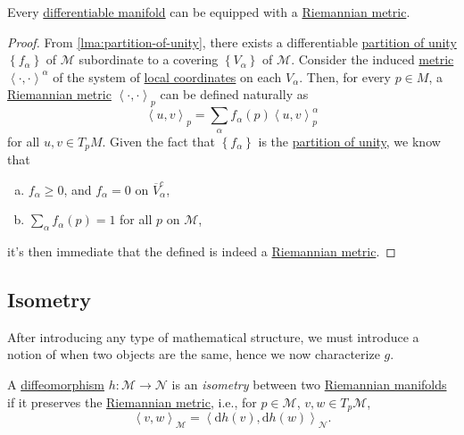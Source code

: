 \begin{theorem}
	Every \hyperref[def:smooth-manifold]{differentiable manifold} can be equipped with a \hyperref[def:Riemannian-metric]{Riemannian metric}.
\end{theorem}
\begin{proof}
	From \autoref{lma:partition-of-unity}, there exists a differentiable \hyperref[def:partition-of-unity]{partition of unity} \(\left\{ f_\alpha \right\} \) of \(\mathcal{M} \) subordinate to a covering \(\left\{ V_\alpha \right\} \) of \(\mathcal{M} \). Consider the induced \hyperref[def:Riemannian-metric]{metric} \( \left\langle \cdot, \cdot \right\rangle ^{\alpha }\) of the system of \hyperref[def:coordinate-chart]{local coordinates} on each \(V_\alpha \). Then, for every \(p\in M\), a \hyperref[def:Riemannian-metric]{Riemannian metric} \(\left\langle \cdot, \cdot \right\rangle _p\) can be defined naturally as
	\[
		\left\langle u, v \right\rangle _p = \sum_{\alpha } f_\alpha (p)\left\langle u, v \right\rangle _p^\alpha
	\]
	for all \(u, v\in T_p M \). Given the fact that \(\left\{ f_\alpha \right\} \) is the \hyperref[def:partition-of-unity]{partition of unity}, we know that
	\begin{enumerate}[(a)]
		\item \(f_\alpha \geq 0\), and \(f_\alpha = 0\) on \(\overline{V} _\alpha ^{c} \),
		\item \(\sum_{\alpha } f_\alpha (p) = 1\) for all \(p\) on \(\mathcal{M} \),
	\end{enumerate}
	it's then immediate that the defined is indeed a \hyperref[def:Riemannian-metric]{Riemannian metric}.
\end{proof}

\subsection{Isometry}
After introducing any type of mathematical structure, we must introduce a notion of when two objects are the same, hence we now characterize \(g\).

\begin{definition}[Isometry]\label{def:isometry}
	A \hyperref[def:diffeomorphism]{diffeomorphism} \(h\colon \mathcal{M} \to \mathcal{N} \) is an \emph{isometry} between two \hyperref[def:Riemannian-manifold]{Riemannian manifolds} if it preserves the \hyperref[def:Riemannian-metric]{Riemannian metric}, i.e., for \(p\in \mathcal{M} \), \(v, w\in T_p \mathcal{M} \),
	\[
		\left\langle v, w \right\rangle _{\mathcal{M} } = \left\langle \mathrm{d} h(v), \mathrm{d} h(w) \right\rangle _{\mathcal{N} }.
	\]
\end{definition}

